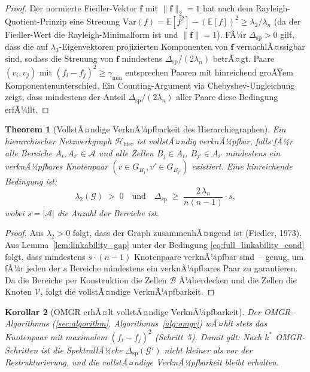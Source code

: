 ﻿\documentclass[12pt, a4paper, openany]{report}
\newtheorem{theorem}{Theorem}[chapter]
\newtheorem{corollary}[theorem]{Korollar}
\newcommand{\E}{\mathbb{E}}
\newcommand{\calG}{\mathcal{G}}
\newcommand{\calH}{\mathcal{H}}
\newcommand{\calV}{\mathcal{V}}
\newcommand{\calA}{\mathcal{A}}
\newcommand{\calB}{\mathcal{B}}
\begin{document}
\begin{proof}
Der normierte Fiedler-Vektor $\bm{f}$ mit $\|\bm{f}\|_2 = 1$ hat nach
dem Rayleigh-Quotient-Prinzip eine Streuung
$\mathrm{Var}(f) = \E[f^2] - (\E[f])^2 \geq \lambda_2 / \lambda_n$
(da der Fiedler-Wert die Rayleigh-Minimalform ist und $\|\bm{f}\|=1$).
FÃ¼r $\Delta_{\mathrm{sp}} > 0$ gilt, dass die auf $\lambda_3$-Eigenvektoren
projizierten Komponenten von $\bm{f}$ vernachlÃ¤ssigbar sind, sodass die
Streuung von $\bm{f}$ mindestens $\Delta_{\mathrm{sp}} / (2\lambda_n)$ betrÃ¤gt.
Paare $(v_i, v_j)$ mit $(f_i - f_j)^2 \geq \gamma_{\min}$ entsprechen
Paaren mit hinreichend groÃŸem Komponentenunterschied.  Ein Counting-Argument
via Chebyshev-Ungleichung zeigt, dass mindestens der Anteil
$\Delta_{\mathrm{sp}} / (2\lambda_n)$ aller Paare diese Bedingung erfÃ¼llt.
\end{proof}

\begin{theorem}[VollstÃ¤ndige VerknÃ¼pfbarkeit des Hierarchiegraphen]
\label{thm:full_linkability}
Ein hierarchischer Netzwerkgraph $\calH_{\mathrm{hier}}$ ist
\emph{vollstÃ¤ndig verknÃ¼pfbar}, falls fÃ¼r alle Bereiche $A_i, A_{i'} \in \calA$
und alle Zellen $B_j \in A_i$, $B_{j'} \in A_{i'}$ mindestens ein
verknÃ¼pfbares Knotenpaar $(v \in G_{B_j}, v' \in G_{B_{j'}})$ existiert.
Eine hinreichende Bedingung ist:
\begin{equation}
  \label{eq:full_linkability_cond}
  \lambda_2(\calG) \;>\; 0
  \quad \text{und} \quad
  \Delta_{\mathrm{sp}} \;\geq\; \frac{2\,\lambda_n}{n(n-1)} \cdot s,
\end{equation}
wobei $s = |\calA|$ die Anzahl der Bereiche ist.
\end{theorem}

\begin{proof}
Aus $\lambda_2 > 0$ folgt, dass der Graph zusammenhÃ¤ngend ist (Fiedler, 1973).
Aus Lemma~\ref{lem:linkability_gap} unter der Bedingung \eqref{eq:full_linkability_cond}
folgt, dass mindestens $s \cdot (n-1)$ Knotenpaare verknÃ¼pfbar sind~--
genug, um fÃ¼r jeden der $s$ Bereiche mindestens ein verknÃ¼pfbares Paar
zu garantieren.  Da die Bereiche per Konstruktion die Zellen $\calB$ Ã¼berdecken
und die Zellen die Knoten $\calV$, folgt die vollstÃ¤ndige VerknÃ¼pfbarkeit.
\end{proof}

\begin{corollary}[OMGR erhÃ¤lt vollstÃ¤ndige VerknÃ¼pfbarkeit]
\label{cor:omgr_linkability}
Der OMGR-Algorithmus (\cref{sec:algorithm}, Algorithmus~\ref{alg:omgr})
wÃ¤hlt stets das Knotenpaar mit maximalem $(f_i - f_j)^2$ (Schritt~5).
Damit gilt: Nach $k^*$ OMGR-Schritten ist die SpektrallÃ¼cke
$\Delta_{\mathrm{sp}}(\calG')$ nicht kleiner als vor der Restrukturierung,
und die vollstÃ¤ndige VerknÃ¼pfbarkeit bleibt erhalten.
\end{corollary}
\end{document}
